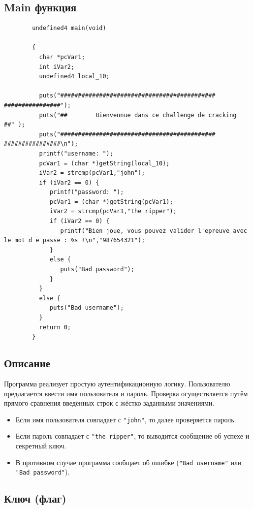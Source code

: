     \subsection{Main функция}

    \begin{verbatim}
        undefined4 main(void)

        {
          char *pcVar1;
          int iVar2;
          undefined4 local_10;

          puts("############################################ ################");
          puts("##        Bienvennue dans ce challenge de cracking        ##" );
          puts("############################################ ################\n");
          printf("username: ");
          pcVar1 = (char *)getString(local_10);
          iVar2 = strcmp(pcVar1,"john");
          if (iVar2 == 0) {
             printf("password: ");
             pcVar1 = (char *)getString(pcVar1);
             iVar2 = strcmp(pcVar1,"the ripper");
             if (iVar2 == 0) {
                printf("Bien joue, vous pouvez valider l'epreuve avec le mot d e passe : %s !\n","987654321");
             }
             else {
                puts("Bad password");
             }
          }
          else {
             puts("Bad username");
          }
          return 0;
        }
    \end{verbatim}

    \subsection{Описание}

    Программа реализует простую аутентификационную логику.
    Пользователю предлагается ввести имя пользователя и пароль.
    Проверка осуществляется путём прямого сравнения введённых строк с жёстко заданными значениями.

    \begin{itemize}
        \item Если имя пользователя совпадает с \texttt{"john"}, то далее проверяется пароль.
        \item Если пароль совпадает с \texttt{"the ripper"}, то выводится сообщение об успехе и секретный ключ.
        \item В противном случае программа сообщает об ошибке (\texttt{"Bad username"} или \texttt{"Bad password"}).
    \end{itemize}

    \subsection*{Ключ (флаг)}

